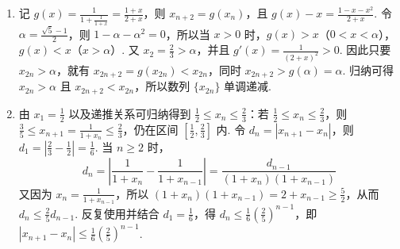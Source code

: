 \begin{solution}
\begin{enumerate}
\item 记 \(g\left(x\right)=\frac{1}{1+\frac{1}{1+x}}=\frac{1+x}{2+x}\)，则 \(x_{n+2}=g\left(x_n\right)\)，且 \(g\left(x\right)-x=\frac{1-x-x^{2}}{2+x}\).
令 \(\alpha=\frac{\sqrt{5}-1}{2}\)，则 \(1-\alpha-\alpha^{2}=0\)，所以当 \(x>0\) 时，\(g\left(x\right)>x\)（\(0<x<\alpha\)），\(g\left(x\right)<x\)（\(x>\alpha\)）. 又 \(x_{2}=\frac{2}{3}>\alpha\)，并且 \(g'\left(x\right)=\frac{1}{\left(2+x\right)^{2}}>0\). 因此只要 \(x_{2n}>\alpha\)，就有 \(x_{2n+2}=g\left(x_{2n}\right)<x_{2n}\)，同时 \(x_{2n+2}>g\left(\alpha\right)=\alpha\). 归纳可得 \(x_{2n}>\alpha\) 且 \(x_{2n+2}<x_{2n}\)，所以数列 \(\{x_{2n}\}\) 单调递减.
\item 由 \(x_{1}=\frac{1}{2}\) 以及递推关系可归纳得到 \(\frac{1}{2}\leqslant x_n\leqslant\frac{2}{3}\)：若 \(\frac{1}{2}\leqslant x_n\leqslant\frac{2}{3}\)，则 \(\frac{3}{5}\leqslant x_{n+1}=\frac{1}{1+x_n}\leqslant\frac{2}{3}\)，仍在区间 \(\left[\frac{1}{2},\frac{2}{3}\right]\) 内. 令 \(d_n=\left|x_{n+1}-x_n\right|\)，则 \(d_1=\left|\frac{2}{3}-\frac{1}{2}\right|=\frac{1}{6}\). 当 \(n\geqslant2\) 时，
\[
d_n=\left|\frac{1}{1+x_n}-\frac{1}{1+x_{n-1}}\right|=\frac{d_{n-1}}{\left(1+x_n\right)\left(1+x_{n-1}\right)}
\]
又因为 \(x_n=\frac{1}{1+x_{n-1}}\)，所以 \(\left(1+x_n\right)\left(1+x_{n-1}\right)=2+x_{n-1}\geqslant\frac{5}{2}\)，从而 \(d_n\leqslant\frac{2}{5}d_{n-1}\). 反复使用并结合 \(d_1=\frac{1}{6}\)，得 \(d_n\leqslant\frac{1}{6}\left(\frac{2}{5}\right)^{n-1}\)，即 \(\left|x_{n+1}-x_n\right|\leqslant\frac{1}{6}\left(\frac{2}{5}\right)^{n-1}\).
\end{enumerate}
\end{solution}
